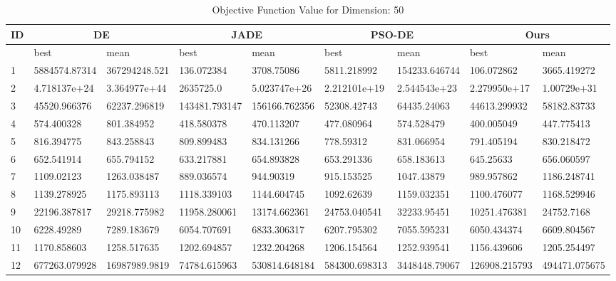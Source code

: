 \begingroup
\renewcommand\arraystretch{0.7}
\begin{table*}[b!]
\centering
\caption{Objective Function Value for Dimension: 50}
 \begin{tabular}{|p{0.8cm}|p{1.6cm}|p{1.6cm}|p{1.6cm}|p{1.6cm}|p{1.6cm}|p{1.6cm}|p{1.6cm}|p{1.6cm}|} 
 \hline
 ID & \multicolumn{2}{c|}{DE} & \multicolumn{2}{c|}{JADE} & \multicolumn{2}{c|}{PSO-DE} & \multicolumn{2}{c|}{Ours} \\
 \hline
    & best & mean & best & mean & best & mean & best & mean \\ [0.5ex] 
 \hline
1  & 5884574.87314 & 367294248.521 & 136.072384 & 3708.75086 & 5811.218992 & 154233.646744 & 106.072862 & 3665.419272 \\ 
2  & 4.718137e+24 & 3.364977e+44 & 2635725.0 & 5.023747e+26 & 2.212101e+19 & 2.544543e+23 & 2.279950e+17 & 1.00729e+31 \\ 
3  & 45520.966376 & 62237.296819 & 143481.793147 & 156166.762356 & 52308.42743 & 64435.24063 & 44613.299932 & 58182.83733 \\ 
4  & 574.400328 & 801.384952 & 418.580378 & 470.113207 & 477.080964 & 574.528479 & 400.005049 & 447.775413 \\ 
5  & 816.394775 & 843.258843 & 809.899483 & 834.131266 & 778.59312 & 831.066954 & 791.405194 & 830.218472 \\ 
6  & 652.541914 & 655.794152 & 633.217881 & 654.893828 & 653.291336 & 658.183613 & 645.25633 & 656.060597 \\ 
7  & 1109.02123 & 1263.038487 & 889.036574 & 944.90319 & 915.153525 & 1047.43879 & 989.957862 & 1186.248741 \\ 
8  & 1139.278925 & 1175.893113 & 1118.339103 & 1144.604745 & 1092.62639 & 1159.032351 & 1100.476077 & 1168.529946 \\ 
9  & 22196.387817 & 29218.775982 & 11958.280061 & 13174.662361 & 24753.040541 & 32233.95451 & 10251.476381 & 24752.7168 \\ 
10  & 6228.49289 & 7289.183679 & 6054.707691 & 6833.306317 & 6207.795302 & 7055.595231 & 6050.434374 & 6609.804567 \\ 
11  & 1170.858603 & 1258.517635 & 1202.694857 & 1232.204268 & 1206.154564 & 1252.939541 & 1156.439606 & 1205.254497 \\ 
12  & 677263.079928 & 16987989.9819 & 74784.615963 & 530814.648184 & 584300.698313 & 3448448.79067 & 126908.215793 & 494471.075675 \\ 

\end{tabular}
\end{table*}
